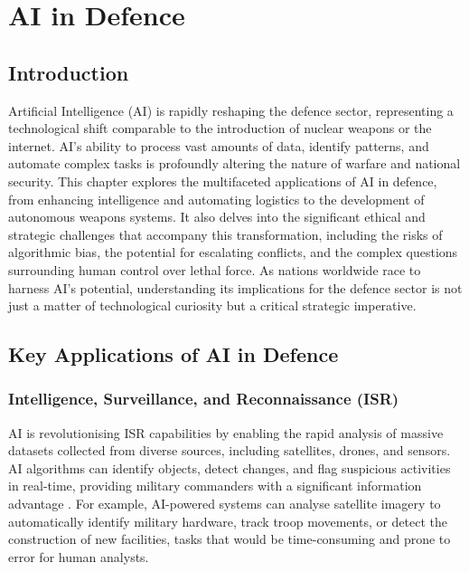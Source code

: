 \chapter{AI in Defence}
\label{cha:ai_in_defence}

\section{Introduction}

Artificial Intelligence (AI) is rapidly reshaping the defence sector, representing a technological shift comparable to the introduction of nuclear weapons or the internet. AI's ability to process vast amounts of data, identify patterns, and automate complex tasks is profoundly altering the nature of warfare and national security. This chapter explores the multifaceted applications of AI in defence, from enhancing intelligence and automating logistics to the development of autonomous weapons systems. It also delves into the significant ethical and strategic challenges that accompany this transformation, including the risks of algorithmic bias, the potential for escalating conflicts, and the complex questions surrounding human control over lethal force. As nations worldwide race to harness AI's potential, understanding its implications for the defence sector is not just a matter of technological curiosity but a critical strategic imperative.

\section{Key Applications of AI in Defence}

\subsection{Intelligence, Surveillance, and Reconnaissance (ISR)}

AI is revolutionising ISR capabilities by enabling the rapid analysis of massive datasets collected from diverse sources, including satellites, drones, and sensors. AI algorithms can identify objects, detect changes, and flag suspicious activities in real-time, providing military commanders with a significant information advantage \parencite{sayler2020artificial}. For example, AI-powered systems can analyse satellite imagery to automatically identify military hardware, track troop movements, or detect the construction of new facilities, tasks that would be time-consuming and prone to error for human analysts.

